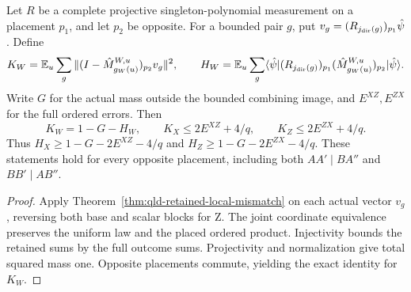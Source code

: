 \begin{theorem}
\label{thm:qld-retained-point-overlap}
\leanok
{}
Let $R$ be a complete projective singleton-polynomial measurement on a
placement $p_1$, and let $p_2$ be opposite. For a bounded pair $g$, put
$v_g=(R_{j_{\rm dir}(g)})_{p_1}\hat\psi$. Define
\[
 K_W=\mathbb E_u\sum_g\|(I-\hat M^{W,u}_{g_W(u)})_{p_2}v_g\|^2,
 \qquad
 H_W=\mathbb E_u\sum_g
 \langle\hat\psi|(R_{j_{\rm dir}(g)})_{p_1}
   (\hat M^{W,u}_{g_W(u)})_{p_2}|\hat\psi\rangle.
\]
Write $G$ for the actual mass outside the bounded combining image, and
$E^{XZ},E^{ZX}$ for the full ordered errors. Then
\[
 K_W=1-G-H_W,\qquad
 K_X\leq2E^{XZ}+4/q,\qquad K_Z\leq2E^{ZX}+4/q.
\]
Thus $H_X\geq1-G-2E^{XZ}-4/q$ and
$H_Z\geq1-G-2E^{ZX}-4/q$. These statements hold for every opposite
placement, including both $AA'\mid BA''$ and $BB'\mid AB''$.
\end{theorem}
\begin{proof}
\leanok
{}
Apply Theorem~\ref{thm:qld-retained-local-mismatch} on each actual vector
$v_g$, reversing both base and scalar blocks for Z. The joint coordinate
equivalence preserves the uniform law and the placed ordered product.
Injectivity bounds the retained sums by the full outcome sums.
Projectivity and normalization give total squared mass one. Opposite
placements commute, yielding the exact identity for $K_W$.
\end{proof}

